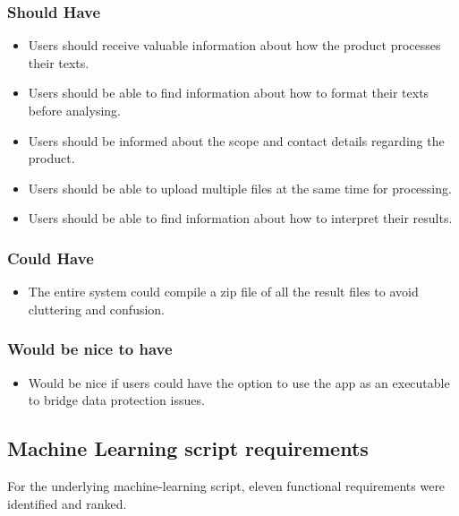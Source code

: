 \documentclass{l4proj}
\begin{document}
\subsubsection{Should Have}
\begin{itemize}
\item
Users should receive valuable information about how the product processes their texts.
\item
Users should be able to find information about how to format their texts before analysing.
\item
Users should be informed about the scope and contact details regarding the product.
\item
Users should be able to upload multiple files at the same time for processing.
\item
Users should be able to find information about how to interpret their results.
\end{itemize}

\subsubsection{Could Have}
\begin{itemize}
\item
The entire system could compile a zip file of all the result files to avoid cluttering and confusion.
\end{itemize}

\subsubsection{Would be nice to have}
\begin{itemize}
\item
Would be nice if users could have the option to use the app as an executable to bridge data protection issues.
\end{itemize}



\subsection{Machine Learning script requirements}
For the underlying machine-learning script, eleven functional requirements were identified and ranked.
\end{document}
